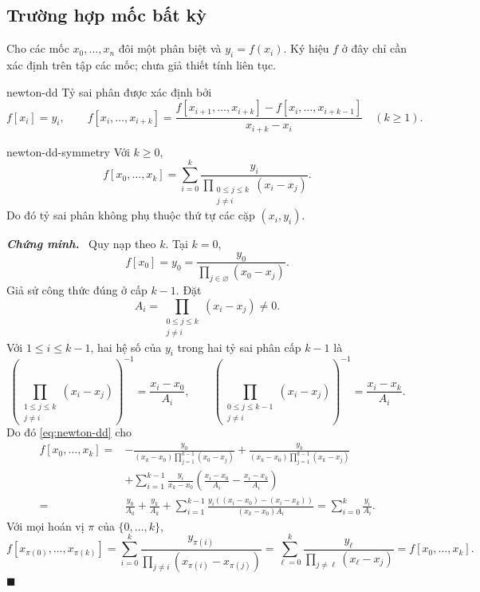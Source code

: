 \documentclass[12pt,a4paper,oneside]{book}
\numberwithin{algorithm}{chapter}
\theoremstyle{definition}
\newenvironment{chungminh}{\par\medskip\noindent\textbf{\textit{\color{mainblue}Chứng minh.}}\ }{\hfill$\blacksquare$\par\medskip}
\begin{document}
\subsection{Trường hợp mốc bất kỳ}
Cho các mốc $x_0,\ldots,x_n$ đôi một phân biệt và $y_i=f(x_i)$. Ký hiệu $f$ ở đây chỉ cần xác định trên tập các mốc; chưa giả thiết tính liên tục.
\begin{dinhnghia}{}{newton-dd}
Tỷ sai phân được xác định bởi
\begin{equation}\label{eq:newton-dd}
 f[x_i]=y_i,\qquad
 f[x_i,\ldots,x_{i+k}]
 =\frac{f[x_{i+1},\ldots,x_{i+k}]-f[x_i,\ldots,x_{i+k-1}]}{x_{i+k}-x_i}
 \quad(k\geq1).
\end{equation}
\end{dinhnghia}
\begin{menhde}{}{newton-dd-symmetry}
Với $k\geq0$,
\begin{equation}\label{eq:newton-dd-explicit}
 f[x_0,\ldots,x_k]
 =\sum_{i=0}^{k}\frac{y_i}{\prod_{\substack{0\leq j\leq k\\j\ne i}}(x_i-x_j)}.
\end{equation}
Do đó tỷ sai phân không phụ thuộc thứ tự các cặp $(x_i,y_i)$.
\end{menhde}
\begin{chungminh}
Quy nạp theo $k$. Tại $k=0$,
\[
 f[x_0]=y_0=\frac{y_0}{\prod_{j\in\varnothing}(x_0-x_j)}.
\]
Giả sử công thức đúng ở cấp $k-1$. Đặt
\[
 A_i=\prod_{\substack{0\leq j\leq k\\j\ne i}}(x_i-x_j)\ne0.
\]
Với $1\leq i\leq k-1$, hai hệ số của $y_i$ trong hai tỷ sai phân cấp $k-1$ là
\[
 \left(\prod_{\substack{1\leq j\leq k\\j\ne i}}(x_i-x_j)\right)^{-1}
 =\frac{x_i-x_0}{A_i},\qquad
 \left(\prod_{\substack{0\leq j\leq k-1\\j\ne i}}(x_i-x_j)\right)^{-1}
 =\frac{x_i-x_k}{A_i}.
\]
Do đó \eqref{eq:newton-dd} cho
\begin{align*}
 f[x_0,\ldots,x_k]
 ={}&-\frac{y_0}{(x_k-x_0)\prod_{j=1}^{k-1}(x_0-x_j)}
 +\frac{y_k}{(x_k-x_0)\prod_{j=1}^{k-1}(x_k-x_j)}\\
 &+\sum_{i=1}^{k-1}\frac{y_i}{x_k-x_0}
       \left(\frac{x_i-x_0}{A_i}-\frac{x_i-x_k}{A_i}\right)\\
 ={}&\frac{y_0}{A_0}+\frac{y_k}{A_k}
 +\sum_{i=1}^{k-1}\frac{y_i((x_i-x_0)-(x_i-x_k))}{(x_k-x_0)A_i}
 =\sum_{i=0}^{k}\frac{y_i}{A_i}.
\end{align*}
Với mọi hoán vị $\pi$ của $\{0,\ldots,k\}$,
\[
 f[x_{\pi(0)},\ldots,x_{\pi(k)}]
 =\sum_{i=0}^{k}\frac{y_{\pi(i)}}{\prod_{j\ne i}(x_{\pi(i)}-x_{\pi(j)})}
 =\sum_{\ell=0}^{k}\frac{y_\ell}{\prod_{j\ne\ell}(x_\ell-x_j)}
 =f[x_0,\ldots,x_k].
\]
\end{chungminh}
\end{document}
